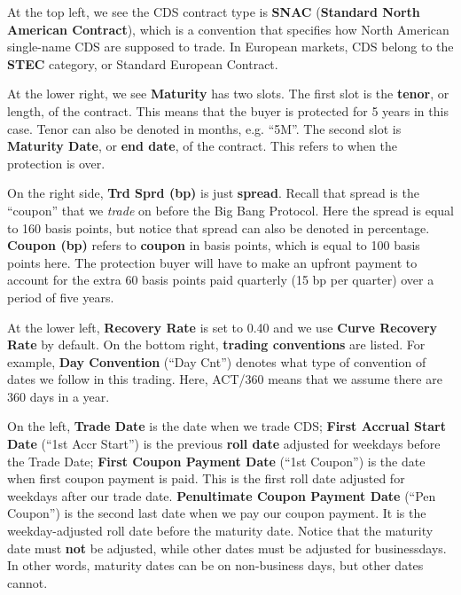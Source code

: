 \documentclass{jss}
\begin{document}
At the top left, we see the CDS contract type is \textbf{SNAC} (\textbf{Standard North American Contract}), which is a convention that specifies how North American single-name CDS are supposed to trade. In European markets, CDS belong to the \textbf{STEC} category, or Standard European Contract.

At the lower right, we see \textbf{Maturity} has two slots. The first slot is the \textbf{tenor}, or length, of the contract. This means that the buyer is protected for 5 years in this case. Tenor can also be denoted in months, e.g. ``5M''. The second slot is \textbf{Maturity Date}, or \textbf{end date}, of the contract. This refers to when the protection is over. 

On the right side, \textbf{Trd Sprd (bp)} is just \textbf{spread}. Recall that spread is the ``coupon'' that we \textit{trade} on before the Big Bang Protocol. Here the spread is equal to 160 basis points, but notice that spread can also be denoted in percentage. \textbf{Coupon (bp)} refers to \textbf{coupon} in basis points, which is equal to 100 basis points here. The protection buyer will have to make an upfront payment to account for the extra 60 basis points paid quarterly (15 bp per quarter) over a period of five years.

At the lower left, \textbf{Recovery Rate} is set to 0.40 and we use \textbf{Curve Recovery Rate} by default. On the bottom right, \textbf{trading conventions} are listed. For example, \textbf{Day Convention} (``Day Cnt'') denotes what type of convention of dates we follow in this trading. Here, ACT/360 means that we assume there are 360 days in a year. 

On the left, \textbf{Trade Date} is the date when we trade CDS; \textbf{First Accrual Start Date} (``1st Accr Start'') is the previous \textbf{roll date} adjusted for weekdays before the Trade Date; \textbf{First Coupon Payment Date} (``1st Coupon'') is the date when first coupon payment is paid. This is the first roll date adjusted for weekdays after our trade date. \textbf{Penultimate Coupon Payment Date} (``Pen Coupon'') is the second last date when we pay our coupon payment. It is the weekday-adjusted roll date before the maturity date. Notice that the maturity date must \textbf{not} be adjusted, while other dates must be adjusted for businessdays. In other words, maturity dates can be on non-business days, but other dates cannot.

\newpage
\end{document}
